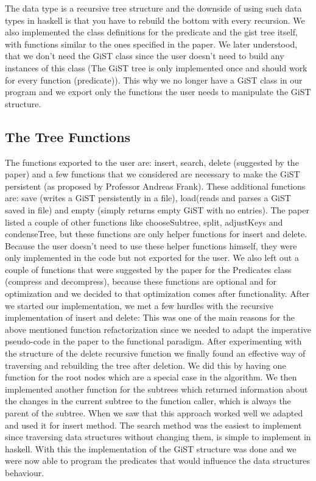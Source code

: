 \documentclass{scrartcl}
\begin{document}
 The data type is a recursive tree structure and the downside of using such data types in haskell is that you have to rebuild the bottom with every recursion.
 We also implemented the class definitions for the predicate and the gist tree itself, with functions similar to the ones specified in the paper. 
 We later understood, that we don't need the GiST class since the user doesn't need to build any instances of this class (The GiST tree is only implemented once and should work
 for every function (predicate)). This why we no longer have a GiST class in our program and we export only the functions the user needs to manipulate the GiST structure.
\subsection{The Tree Functions}
The functions exported to the user are: insert, search, delete (suggested by the paper) and a few functions that we considered are necessary to make the GiST persistent (as proposed by Professor Andreas Frank).
These additional functions are: save (writes a GiST persistently in a file), load(reads and parses a GiST saved in file) and empty (simply returns empty GiST with no entries).
The paper \cite{Hellerstein95generalizedsearch} listed a couple of other functions like chooseSubtree, split, adjustKeys and condenseTree, but these functions are only helper functions for insert and delete.
Because the user doesn't need to use these helper functions himself, they were only implemented in the code but not exported for the user. 
We also left out a couple of functions that were suggested by the paper for the Predicates class (compress and decompress), because these functions are optional and for optimization and
we decided to that optimization comes after functionality.
After we started our implementation, we met a few hurdles with the recursive implementation of insert and delete: This was one of the main reasons for the above mentioned function refactorization since we needed
to adapt the imperative pseudo-code in the paper to the functional paradigm. 
After experimenting with the structure of the delete recursive function we finally found an effective way of traversing and rebuilding the tree after deletion. We did this
by having one function for the root nodes which are a special case in the algorithm.
We then implemented another function for the subtrees which returned information about the changes in the current subtree to the function caller, which is always the parent
of the subtree. When we saw that this approach worked well we adapted and used it for insert method. The search method was the easiest to implement since traversing data structures without changing 
them, is simple to implement in haskell. With this the implementation of the GiST structure was done and we were now able to program the predicates that would influence the data structures behaviour.
\end{document}

